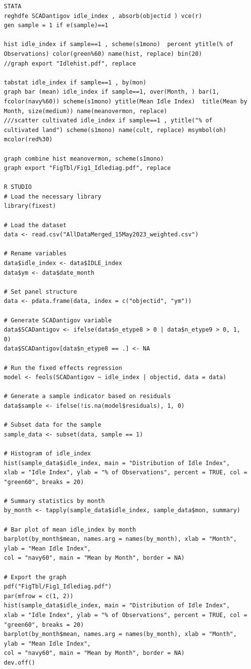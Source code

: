 \documentclass[12pt,letterpaper]{article}
\begin{document}
\begin{lstlisting}
STATA
reghdfe SCADantigov idle_index , absorb(objectid ) vce(r)  
gen sample = 1 if e(sample)==1

hist idle_index if sample==1 , scheme(s1mono)  percent ytitle(% of Observations) color(green%60) name(hist, replace) bin(20)
//graph export "Idlehist.pdf", replace

tabstat idle_index if sample==1 , by(mon)
graph bar (mean) idle_index if sample==1, over(Month, ) bar(1, fcolor(navy%60)) scheme(s1mono) ytitle(Mean Idle Index)  title(Mean by Month, size(medium)) name(meanovermon, replace)
///scatter cultivated idle_index if sample==1 , ytitle("% of cultivated land") scheme(s1mono) name(cult, replace) msymbol(oh) mcolor(red%30)

graph combine hist meanovermon, scheme(s1mono)
graph export "FigTbl/Fig1_Idlediag.pdf", replace

R STUDIO
# Load the necessary library
library(fixest)

# Load the dataset
data <- read.csv("AllDataMerged_15May2023_weighted.csv")

# Rename variables
data$idle_index <- data$IDLE_index
data$ym <- data$date_month

# Set panel structure
data <- pdata.frame(data, index = c("objectid", "ym"))

# Generate SCADantigov variable
data$SCADantigov <- ifelse(data$n_etype8 > 0 | data$n_etype9 > 0, 1, 0)
data$SCADantigov[data$n_etype8 == .] <- NA

# Run the fixed effects regression
model <- feols(SCADantigov ~ idle_index | objectid, data = data)

# Generate a sample indicator based on residuals
data$sample <- ifelse(!is.na(model$residuals), 1, 0)

# Subset data for the sample
sample_data <- subset(data, sample == 1)

# Histogram of idle_index
hist(sample_data$idle_index, main = "Distribution of Idle Index",
xlab = "Idle Index", ylab = "% of Observations", percent = TRUE, col = "green60", breaks = 20)

# Summary statistics by month
by_month <- tapply(sample_data$idle_index, sample_data$mon, summary)

# Bar plot of mean idle_index by month
barplot(by_month$mean, names.arg = names(by_month), xlab = "Month", ylab = "Mean Idle Index",
col = "navy60", main = "Mean by Month", border = NA)

# Export the graph
pdf("FigTbl/Fig1_Idlediag.pdf")
par(mfrow = c(1, 2))
hist(sample_data$idle_index, main = "Distribution of Idle Index",
xlab = "Idle Index", ylab = "% of Observations", percent = TRUE, col = "green60", breaks = 20)
barplot(by_month$mean, names.arg = names(by_month), xlab = "Month", ylab = "Mean Idle Index",
col = "navy60", main = "Mean by Month", border = NA)
dev.off()
\end{lstlisting}
\end{document}
